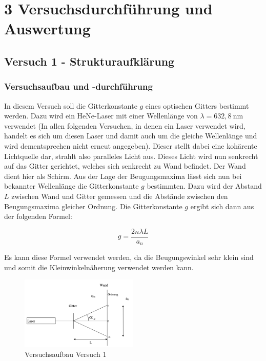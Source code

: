 \chapter*{3 Versuchsdurchführung und Auswertung}
\setcounter{chapter}{3}
\setcounter{section}{0}
\setcounter{subsection}{0}

\section{Versuch 1 - Strukturaufklärung}

    \subsection{Versuchsaufbau und -durchführung}

        In diesem Versuch soll die Gitterkonstante $g$ eines optischen Gitters bestimmt werden. Dazu wird ein HeNe-Laser mit einer Wellenlänge von $\lambda = 632,8\ \mathrm{nm}$ verwendet (In allen folgenden Versuchen, in denen ein Laser verwendet wird, handelt es sich um diesen Laser und damit auch um die gleiche Wellenlänge und wird dementsprechen nicht erneut angegeben). Dieser stellt dabei eine kohärente Lichtquelle dar, strahlt also paralleles Licht aus. Dieses
        Licht wird nun senkrecht auf das Gitter gerichtet, welches sich senkrecht zu Wand befindet. Der Wand dient hier als Schirm. Aus der Lage der Beugungsmaxima lässt sich nun bei bekannter Wellenlänge die Gitterkonstante $g$ bestimmten. Dazu wird der Abstand $L$ zwischen Wand und Gitter gemessen und die Abstände zwischen den Beugungsmaxima gleicher Ordnung. Die Gitterkonstante $g$ ergibt sich dann aus der folgenden Formel:

        \begin{equation}
            g = \frac{2 n \lambda L}{a_{n}}
        \end{equation}

        Es kann diese Formel verwendet werden, da die Beugungswinkel sehr klein sind und somit die Kleinwinkelnäherung verwendet werden kann.

        \begin{figure}
            \centering
            \includegraphics[width=0.5\textwidth]{bilder/Physik_Aufbau_01.png}
            \caption{Versuchsaufbau Versuch 1}
            \label{fig:Versuchsaufbau1}
        \end{figure}
    
